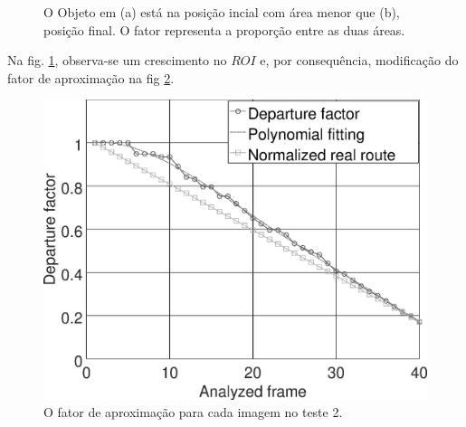 \begin{figure}[H]
\centering
  \caption{O Objeto em (a) está na posição incial com área menor que (b), 
  posição final. O fator representa a proporção entre as duas áreas.}
  \label{fig:target}
\end{figure}

Na fig. \ref{fig:target}, observa-se um crescimento no $ROI$ e, por
consequência, modificação do fator de aproximação na fig \ref{fig:res_grapha_b}.

\begin{figure}[H]
\includegraphics[width=\columnwidth]{images/grapha_b.eps}
\caption{O fator de aproximação para cada imagem no teste 2.}
\label{fig:res_grapha_b}
\end{figure}

